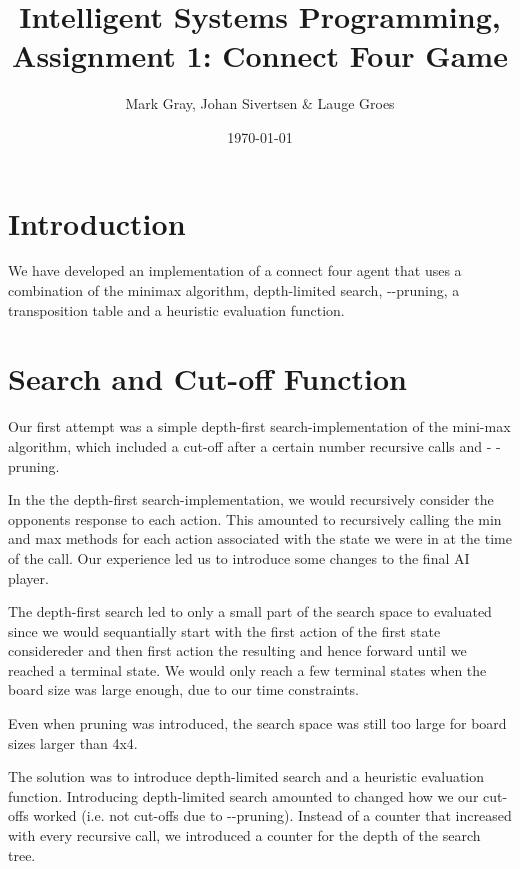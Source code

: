 \documentclass[11pt, a4paper]{article}
\author{Mark Gray, Johan Sivertsen \& Lauge Groes}
\title{Intelligent Systems Programming, Assignment 1: Connect Four Game}
\date{\today}
\begin{document}
\maketitle
\newpage
\section*{Introduction}


We have developed an implementation of a connect four agent that uses a
combination of the minimax algorithm, depth-limited search,
\alpha-\beta-pruning, a transposition table and a heuristic evaluation function.

\section*{Search and Cut-off Function}
Our first attempt was a simple depth-first search-implementation of the
mini-max algorithm, which included a cut-off after a certain number recursive
calls and \alpha - \beta-pruning. 

In the the depth-first search-implementation, we would recursively consider the
opponents response to each action. This amounted to recursively calling the min
and max methods for each action associated with the state we were in at the time
of the call. Our experience led us to introduce some changes to the final AI
player.

The depth-first search led to only a small part of the search space to
evaluated since we would sequantially start with the first action of the first
state considereder and then first action the resulting and hence forward until
we reached a terminal state. We would only reach a few terminal states when the
board size was large enough, due to our time constraints.

Even when \alpha\-\beta\-pruning was introduced, the search space was still too
large for board sizes larger than 4x4. 

The solution was to introduce depth-limited search and a heuristic evaluation
function. Introducing depth-limited search amounted to changed how we our
cut-offs worked (i.e. not cut-offs due to \alpha-\beta-pruning). Instead of a
counter that increased with every recursive call, we introduced a counter for
the depth of the search tree.
\end{document}
